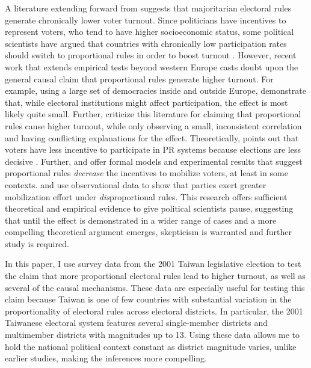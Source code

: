 \documentclass[12pt]{article}
\begin{document}
\doublespace
A literature extending forward from \cite{Powell1986} suggests that majoritarian electoral rules generate chronically lower voter turnout. Since politicians have incentives to represent voters, who tend to have higher socioeconomic status, some political scientists have argued that countries with chronically low participation rates should switch to proportional rules in order to boost turnout \citep{Lijphart1997, Lijphart1999}. However, recent work that extends empirical tests beyond western Europe casts doubt upon the general causal claim that proportional rules generate higher turnout. For example, using a large set of democracies inside and outside Europe, \cite{BlaisDobrzynska1998} demonstrate that, while electoral institutions might affect participation, the effect is most likely quite small. Further, \cite{BlaisAarts2006} criticize this literature for claiming that proportional rules cause higher turnout, while only observing a small, inconsistent correlation and having conflicting explanations for the effect. Theoretically, \cite{Jackman1987} points out that voters have less incentive to participate in PR systems because elections are less decisive \citep{Powell2000}. Further, \cite{SchramSonnemans1996} and \cite{HerreraMorelliPalfrey2013} offer formal models and experimental results that suggest proportional rules \textit{decrease} the incentives to mobilize voters, at least in some contexts. \cite{KarpBanducciBowler2007} and \cite{Rainey2015} use observational data to show that parties exert greater mobilization effort under \textit{dis}proportional rules. This research offers sufficient theoretical and empirical evidence to give political scientists pause, suggesting that until the effect is demonstrated in a wider range of cases and a more compelling theoretical argument emerges, skepticism is warranted and further study is required.

In this paper, I use survey data from the 2001 Taiwan legislative election to test the claim that more proportional electoral rules lead to higher turnout, as well as several of the causal mechanisms. These data are especially useful for testing this claim because Taiwan is one of few countries with substantial variation in the proportionality of electoral rules across electoral districts. In particular, the 2001 Taiwanese electoral system features several single-member districts and multimember districts with magnitudes up to 13. Using these data allows me to hold the national political context constant as district magnitude varies, unlike earlier studies, making the inferences more compelling.
\end{document}
